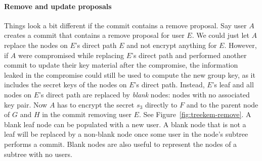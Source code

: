 \paragraph{Remove and update proposals} Things look a bit different if the commit contains a remove proposal. Say user $A$ creates a commit that contains a remove proposal for user $E$. We could just let $A$ replace the nodes on $E$'s direct path $E$ and not encrypt anything for $E$. However, if $A$ were compromised while replacing $E$'s direct path and performed another commit to update their key material after the compromise, the information leaked in the compromise could still be used to compute the new group key, as it includes the secret keys of the nodes on $E$'s direct path.
Instead, $E$'s leaf and all nodes on $E$'s direct path are replaced by \emph{blank} nodes: nodes with no associated key pair. Now $A$ has to encrypt the secret $s_3$ directly to $F$ and to the parent node of $G$ and $H$ in the commit removing user $E$. See Figure~\ref{fig:treekem-remove}. A blank leaf node can be populated with a new user. A blank node that is not a leaf will be replaced by a non-blank node once some user in the node's subtree performs a commit. Blank nodes are also useful to represent the nodes of a subtree with no users.

